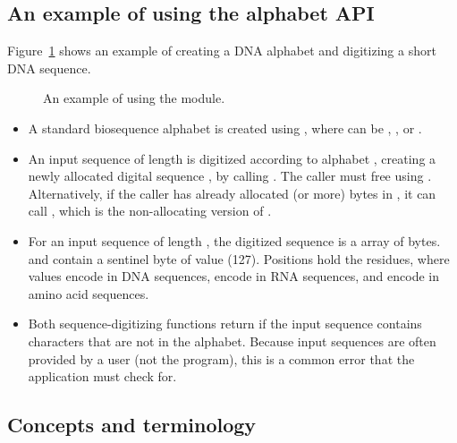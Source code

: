 \subsection{An example of using the alphabet API}

Figure~\ref{fig:alphabet_example} shows an example of creating a DNA
alphabet and digitizing a short DNA sequence.

\begin{figure}

\caption{An example of using the  module.}
\label{fig:alphabet_example}
\end{figure}

\begin{itemize}
\item A standard biosequence alphabet is created using
, where  can be
, , or .

\item An input sequence  of length  is digitized
according to alphabet , creating a newly allocated digital
sequence , by calling . The caller must free  using .
Alternatively, if the caller has already allocated  (or
more) bytes in , it can call , which is the non-allocating version of
.

\item For an input sequence of length , the digitized
sequence  is a  array of 
bytes.  and  contain a sentinel byte of
value  (127).  Positions  hold the
residues, where values  encode  in DNA
sequences,  encode  in RNA sequences, and
 encode  in amino acid sequences.

\item Both sequence-digitizing functions return  if
the input sequence contains characters that are not in the
alphabet. Because input sequences are often provided by a user (not
the program), this is a common error that the application must check
for.
\end{itemize}

\subsection{Concepts and terminology}

